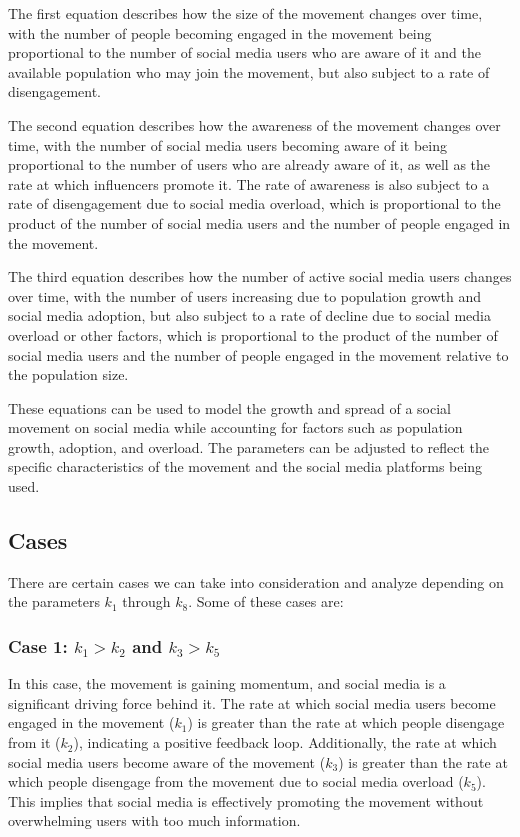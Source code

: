 \documentclass{article}
\begin{document}
    The first equation describes how the size of the movement changes over time, with the number of people becoming engaged in the movement being proportional to the number of social media users who are aware of it and the available population who may join the movement, but also subject to a rate of disengagement. 
    
	The second equation describes how the awareness of the movement changes over time, with the number of social media users becoming aware of it being proportional to the number of users who are already aware of it, as well as the rate at which influencers promote it. The rate of awareness is also subject to a rate of disengagement due to social media overload, which is proportional to the product of the number of social media users and the number of people engaged in the movement. 
 
	The third equation describes how the number of active social media users changes over time, with the number of users increasing due to population growth and social media adoption, but also subject to a rate of decline due to social media overload or other factors, which is proportional to the product of the number of social media users and the number of people engaged in the movement relative to the population size. 
 
	These equations can be used to model the growth and spread of a social movement on social media while accounting for factors such as population growth, adoption, and overload. The parameters can be adjusted to reflect the specific characteristics of the movement and the social media platforms being used.
 

    \subsection{Cases}
    
    There are certain cases we can take into consideration and analyze depending on the parameters $k_1$ through $k_8$. Some of these cases are: 
    
    \subsubsection*{Case 1: $k_1 > k_2$ and $k_3 > k_5$}
    In this case, the movement is gaining momentum, and social media is a significant driving force behind it. The rate at which social media users become engaged in the movement ($k_1$) is greater than the rate at which people disengage from it ($k_2$), indicating a positive feedback loop. Additionally, the rate at which social media users become aware of the movement ($k_3$) is greater than the rate at which people disengage from the movement due to social media overload ($k_5$). This implies that social media is effectively promoting the movement without overwhelming users with too much information.
\end{document}
